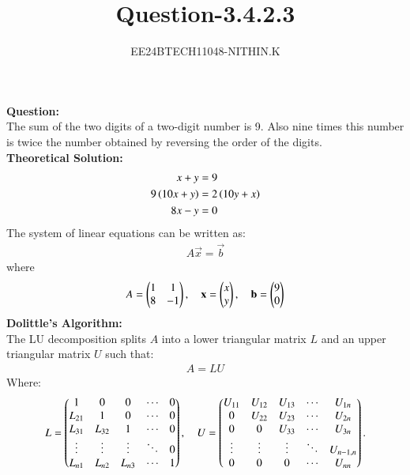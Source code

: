 \documentclass[journal]{IEEEtran}
\numberwithin{equation}{enumi}
\numberwithin{figure}{enumi}
\begin{document}


\title{Question-3.4.2.3}
\author{EE24BTECH11048-NITHIN.K} 
{\let\newpage\relax\maketitle}
\textbf{Question:}\\
The sum of the two digits of a two-digit number is 9. Also nine times this number is twice the number obtained by reversing the order of the digits.\\
\textbf{Theoretical Solution:}\\
\begin{align}
	x + y &= 9\\
	9\left(10x + y\right) &= 2\left(10y + x\right)\\
	8x - y &= 0
\end{align}
The system of linear equations can be written as:
\begin{align}
	A\vec{x} = \vec{b}
\end{align}
where
\begin{align}
	A = \begin{pmatrix}1 & 1\\
	8 & -1\end{pmatrix},\quad \mathbf{x} = \begin{pmatrix}x\\y\end{pmatrix},\quad \mathbf{b} = \begin{pmatrix}9\\0\end{pmatrix}
\end{align}
\textbf{Dolittle's Algorithm:}\\
The LU decomposition splits $A$ into a lower triangular matrix $L$ and an upper triangular matrix $U$ such that:\\
\begin{align}
	A = LU
\end{align}
Where:\\
\begin{align}
	L = \begin{pmatrix}1 & 0 & 0 & \cdots & 0 \\ L_{21} & 1 & 0 & \cdots & 0 \\ L_{31} & L_{32} & 1 & \cdots & 0 \\ \vdots & \vdots & \vdots & \ddots & 0 \\ L_{n1} & L_{n2} & L_{n3} & \cdots & 1\end{pmatrix},\quad
	U = \begin{pmatrix}U_{11} & U_{12} & U_{13} & \cdots & U_{1n} \\ 0 & U_{22} & U_{23} & \cdots & U_{2n} \\ 0 & 0 & U_{33} & \cdots & U_{3n} \\ \vdots & \vdots & \vdots & \ddots & U_{n-1,n} \\ 0 & 0 & 0 & \cdots & U_{nn}\end{pmatrix}.
\end{align}
\end{document}
